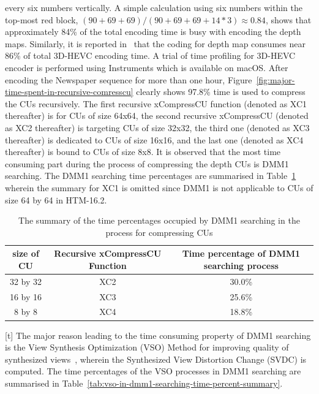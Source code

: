 every six numbers vertically.
A simple calculation using six numbers within the top-most
red block, \((90+69+69)/(90+69+69+14*3) \approx 0.84\), shows that
approximately 84\% of the total encoding time is busy with encoding
the depth maps.
Similarly, it is reported in~\parencite{RN111} that the coding for depth map
consumes near 86\% of total 3D-HEVC encoding time.
A trial of time profiling for 3D-HEVC encoder is performed using Instruments
which is available on macOS.
After encoding the Newspaper sequence for more than one hour,
Figure~\ref{fig:major-time-spent-in-recursive-comresscu} clearly shows
97.8\% time is used to compress the CUs recursively.
The first recursive xCompressCU function (denoted as XC1 thereafter) is
for CUs of size 64x64, the second recursive xCompressCU
(denoted as XC2 thereafter) is targeting CUs of size 32x32,
the third one (denoted as XC3 thereafter) is dedicated
to CUs of size 16x16, and the last one (denoted as XC4 thereafter) is bound
to CUs of size 8x8.
It is observed that the most time consuming part during the process of
compressing the depth CUs is DMM1 searching.
The DMM1 searching time percentages are summarised in
Table~\ref{tab:dmm1-searching-time-percent-summary} wherein the summary
for XC1 is omitted since DMM1 is not applicable to CUs of size 64 by 64 in
HTM-16.2.
\begin{table}[t]
    \caption{The summary of the time percentages occupied by DMM1 searching in the process for compressing CUs}
    \bigskip
    \label{tab:dmm1-searching-time-percent-summary}
    \centering
    \begin{tabular}{c c c}
        \hline
        size of CU & Recursive xCompressCU Function & Time percentage of DMM1 searching process\\
        \hline
        32 by 32  & XC2 & 30.0\% \\
        16 by 16 & XC3 & 25.6\% \\
        8 by 8 & XC4 & 18.8\% \\
        \hline
    \end{tabular}
\end{table}[t]
The major reason leading to the time consuming property of DMM1 searching is the
View Synthesis Optimization (VSO) Method for improving quality of
synthesized views~\parencite{RN124}, wherein the Synthesized View Distortion
Change (SVDC) is computed.
The time percentages of the VSO processes in DMM1 searching are summarised in
Table~\ref{tab:vso-in-dmm1-searching-time-percent-summary}.
